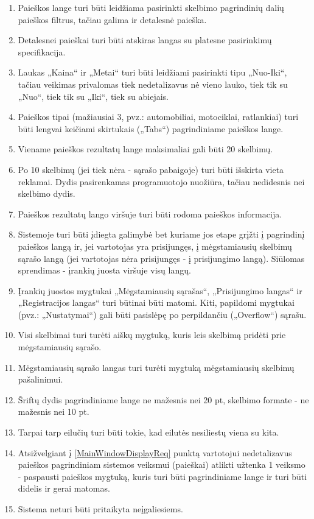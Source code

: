 \documentclass[12pt]{article}
\begin{document}
\begin{enumerate}[labelindent=10pt,leftmargin=2.2cm]
		\item Paieškos lange turi būti leidžiama pasirinkti skelbimo pagrindinių dalių paieškos filtrus, tačiau galima ir detalesnė paieška.
		\item Detalesnei paieškai turi būti atskiras langas su platesne pasirinkimų specifikacija.
		\item Laukas „Kaina“ ir „Metai“ turi būti leidžiami pasirinkti tipu „Nuo-Iki“, tačiau veikimas privalomas tiek nedetalizavus nė vieno lauko, tiek tik su „Nuo“, tiek tik su „Iki“, tiek su abiejais.
		\item Paieškos tipai (mažiausiai 3, pvz.: automobiliai, motociklai, ratlankiai) turi būti lengvai keičiami skirtukais („Tabs“) pagrindiniame paieškos lange.
		\item Viename paieškos rezultatų lange maksimaliai gali būti 20 skelbimų.
		\item Po 10 skelbimų (jei tiek nėra - sąrašo pabaigoje) turi būti išskirta vieta reklamai. Dydis pasirenkamas programuotojo nuožiūra, tačiau nedidesnis nei skelbimo dydis.
		\item Paieškos rezultatų lango viršuje turi būti rodoma paieškos informacija.
		\item Sistemoje turi būti įdiegta galimybė bet kuriame jos etape grįžti į pagrindinį paieškos langą ir, jei vartotojas yra prisijungęs, į mėgstamiausių skelbimų sąrašo langą (jei vartotojas nėra prisijungęs - į prisijungimo langą). Siūlomas sprendimas - įrankių juosta viršuje visų langų.
		\item Įrankių juostos mygtukai „Mėgstamiausių sąrašas“, „Prisijungimo langas“ ir „Registracijos langas“ turi būtinai būti matomi. Kiti, papildomi mygtukai (pvz.: „Nustatymai“) gali būti pasislėpę po perpildančiu („Overflow“) sąrašu.
		\item Visi skelbimai turi turėti aiškų mygtuką, kuris leis skelbimą pridėti prie mėgstamiausių sąrašo.
		\item Mėgstamiausių sąrašo langas turi turėti mygtuką mėgstamiausių skelbimų pašalinimui.
		\item Šriftų dydis pagrindiniame lange ne mažesnis nei 20 pt, skelbimo formate - ne mažesnis nei 10 pt.
		\item Tarpai tarp eilučių turi būti tokie, kad eilutės nesiliestų viena su kita.
		\item Atsižvelgiant į \ref{MainWindowDisplayReq} punktą vartotojui nedetalizavus paieškos pagrindiniam sistemos veiksmui (paieškai) atlikti užtenka 1 veiksmo - paspausti paieškos mygtuką, kuris turi būti pagrindiniame lange ir turi būti didelis ir gerai matomas.
		\item Sistema neturi būti pritaikyta neįgaliesiems.
	\end{enumerate}
	
\end{document}
